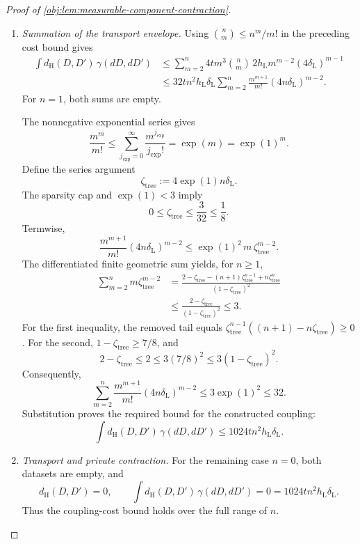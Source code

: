 \begin{proof}[Proof of \cref{obj:lem:measurable-component-contraction}]
\begin{enumerate}
\item \textit{Summation of the transport envelope.}
Using \(\binom nm\le n^m/m!\) in the preceding cost bound gives
\[
\begin{aligned}
\int d_{\mathrm H}(D,D')\,\gamma(dD,dD')
&\le
\sum_{m=2}^n
4tm^3\binom nm\,2h_{\mathrm L}m^{m-2}
 (4\delta_{\mathrm L})^{m-1}\\
&\le
32tn^2h_{\mathrm L}\delta_{\mathrm L}
\sum_{m=2}^n
\frac{m^{m+1}}{m!}(4n\delta_{\mathrm L})^{m-2}.
\end{aligned}
\]
For \(n=1\), both sums are empty.

The nonnegative exponential series gives
\[
\frac{m^m}{m!}
\le
\sum_{j_{\mathrm{exp}}=0}^{\infty}
 \frac{m^{j_{\mathrm{exp}}}}{j_{\mathrm{exp}}!}
=\exp(m)
=\exp(1)^m.
\]
Define the series argument
\[
\zeta_{\mathrm{tree}}
:=4\exp(1)n\delta_{\mathrm L}.
\]
The sparsity cap and \(\exp(1)<3\) imply
\[
0\le\zeta_{\mathrm{tree}}
\le\frac3{32}
\le\frac18.
\]
Termwise,
\[
\frac{m^{m+1}}{m!}(4n\delta_{\mathrm L})^{m-2}
\le
\exp(1)^2\,m\,\zeta_{\mathrm{tree}}^{m-2}.
\]
The differentiated finite geometric sum yields, for \(n\ge1\),
\[
\begin{aligned}
\sum_{m=2}^n m\zeta_{\mathrm{tree}}^{m-2}
&=
\frac{
2-\zeta_{\mathrm{tree}}
-(n+1)\zeta_{\mathrm{tree}}^{n-1}
+n\zeta_{\mathrm{tree}}^n
}{(1-\zeta_{\mathrm{tree}})^2}\\
&\le
\frac{2-\zeta_{\mathrm{tree}}}
 {(1-\zeta_{\mathrm{tree}})^2}
\le3.
\end{aligned}
\]
For the first inequality, the removed tail equals
\(\zeta_{\mathrm{tree}}^{n-1}
 ((n+1)-n\zeta_{\mathrm{tree}})\ge0\).
For the second, \(1-\zeta_{\mathrm{tree}}\ge7/8\), and
\[
2-\zeta_{\mathrm{tree}}
\le2
\le3(7/8)^2
\le3(1-\zeta_{\mathrm{tree}})^2.
\]
Consequently,
\[
\sum_{m=2}^n
\frac{m^{m+1}}{m!}(4n\delta_{\mathrm L})^{m-2}
\le3\exp(1)^2
\le32.
\]
Substitution proves the required bound for the constructed coupling:
\[
\int d_{\mathrm H}(D,D')\,\gamma(dD,dD')
\le1024tn^2h_{\mathrm L}\delta_{\mathrm L}.
\]

\item \textit{Transport and private contraction.}
For the remaining case \(n=0\), both datasets are empty, and
\[
d_{\mathrm H}(D,D')=0,
\qquad
\int d_{\mathrm H}(D,D')\,\gamma(dD,dD')
=0
=1024tn^2h_{\mathrm L}\delta_{\mathrm L}.
\]
Thus the coupling-cost bound holds over the full range of \(n\).


\end{enumerate}
\end{proof}
